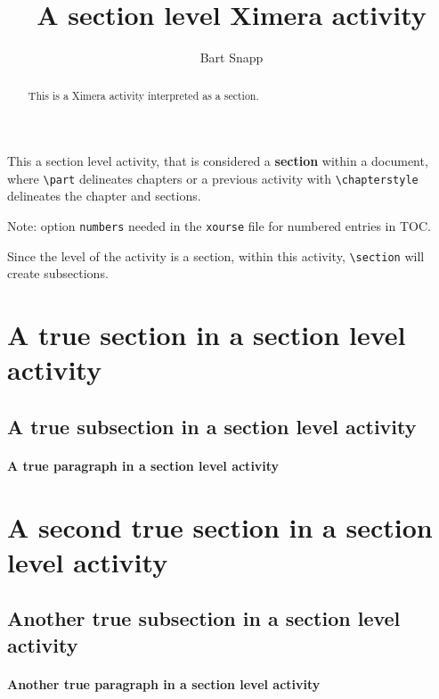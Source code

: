 \documentclass{ximera}
\author{Bart Snapp}
\title{A section level Ximera activity}
\begin{document}
\begin{abstract}
This is a Ximera activity interpreted as a section.
\end{abstract}
\maketitle

This a section level activity, that is considered a
\textbf{section} within a document, where \verb!\part! delineates chapters or a
previous activity with \verb!\chapterstyle! delineates the chapter and sections.

Note: option \verb!numbers! needed in the \verb!xourse! file for numbered entries in TOC.

\begin{warning}
    Since the level of the activity is a section, within this activity,
    \verb!\section! will create subsections.
\end{warning}

\section{A true section in a section level activity}
\lipsum[1][1-2]

\subsection{A true subsection in a section level activity}
\lipsum[1][1-2]

\paragraph{A true paragraph in a section level activity}
\lipsum[1][1]

\section{A second true section in a section level activity}
\lipsum[1][1-2]

\subsection{Another true subsection in a section level activity}
\lipsum[1][1-2]

\paragraph{Another true paragraph in a section level activity}
\lipsum[1][1]
\end{document}
